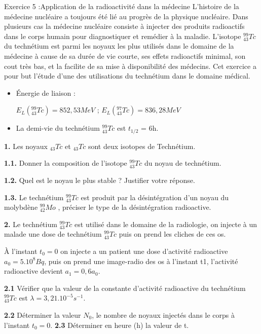 \documentclass[12pt, french]{article}
\begin{document}
\begin{Box2}{Exercice 5 :Application de la radioactivité dans la médecine }
L’histoire de la médecine nucléaire a toujours été lié au progrès de la physique nucléaire. Dans
plusieurs cas la médecine nucléaire consiste à injecter des produits radioactifs dans le corps humain
pour diagnostiquer et remédier à la maladie. L’isotope $^{99}_{43}Tc$ du technétium est parmi les noyaux les
plus utilisés dans le domaine de la médecine à cause de sa durée de vie courte, ses effets radioactifs
minimal, son cout très bas, et la facilite de sa mise à disponibilité des médecins.
Cet exercice a pour but l’étude d’une des utilisations du technétium dans le domaine médical.
\begin{itemize}
	\item Énergie de liaison : 

		$E_L(^{99}_{43}Tc) = 852,53MeV$ ; $E_L(^{97}_{43}Tc) = 836,28MeV$

	\item La demi-vie du technétium $^{99}_{43}Tc$ est $t_{1/2}$ = 6h.
\end{itemize}

\textbf{1. }Les noyaux $_{43}Tc$ et $_{43}Tc$ sont deux isotopes de Technétium.

\textbf{1.1. }Donner la composition de l’isotope $^{99}_{43}Tc$ du noyau de technétium.

\textbf{1.2. }Quel est le noyau le plus stable ? Justifier votre réponse.

\textbf{1.3. }Le technétium $^{99}_{43}Tc$ est produit par la désintégration d’un noyau du molybdène $^{99}_{42}Mo$ , préciser le type de la désintégration
radioactive.

\textbf{2. }Le technétium $^{99}_{43}Tc$ est utilisé dans le domaine de la radiologie, on injecte à un malade une dose de technétium $^{99}_{43}Tc$ puis on prend les cliches de ces os.

À l’instant $t_0=0$ on injecte a un patient une dose d’activité radioactive $a_0 = 5.10^8Bq$, puis on prend
une image-radio des os à l’instant t1, l’activité radioactive devient $a_1 = 0,6a_0$.

\textbf{2.1 }Vérifier que la valeur de la constante d’activité radioactive du technétium $^{99}_{43}Tc$ est $\lambda = 3,21.10^{-5} s^{-1}$.

\textbf{2.2 }Déterminer la valeur $N_0$, le nombre de noyaux injectés dans le corps à l’instant $t_0 =0$.
\textbf{2.3 }Déterminer en heure (h) la valeur de t.

\end{Box2}
\end{document}
